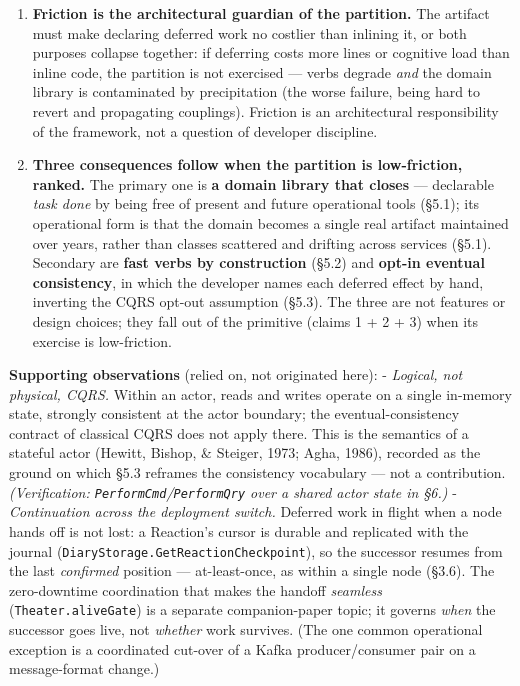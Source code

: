 \documentclass[
]{article}
\let\origtexttt\texttt%
\renewcommand{\texttt}[1]{\origtexttt{\seqsplit{#1}}}%
\let\texttt\origtexttt%
\begin{document}
\begin{enumerate}
\begin{itemize}
    pattern correlates a trajectory, its constituent events can be
    marked elided (\texttt{Metadata.Elide}, §6.5), so the \emph{skips}
    of \href{01-anti-porosity.md}{Paper 1} become the natural outcome of
    a declarative correlation rather than a post-hoc optimization.
  \end{itemize}
\item
  \textbf{Friction is the architectural guardian of the partition.} The
  artifact must make declaring deferred work no costlier than inlining
  it, or both purposes collapse together: if deferring costs more lines
  or cognitive load than inline code, the partition is not exercised ---
  verbs degrade \emph{and} the domain library is contaminated by
  precipitation (the worse failure, being hard to revert and propagating
  couplings). Friction is an architectural responsibility of the
  framework, not a question of developer discipline.
\item
  \textbf{Three consequences follow when the partition is low-friction,
  ranked.} The primary one is \textbf{a domain library that closes} ---
  declarable \emph{task done} by being free of present and future
  operational tools (§5.1); its operational form is that the domain
  becomes a single real artifact maintained over years, rather than
  classes scattered and drifting across services (§5.1). Secondary are
  \textbf{fast verbs by construction} (§5.2) and \textbf{opt-in eventual
  consistency}, in which the developer names each deferred effect by
  hand, inverting the CQRS opt-out assumption (§5.3). The three are not
  features or design choices; they fall out of the primitive (claims 1 +
  2 + 3) when its exercise is low-friction.
\end{enumerate}

\textbf{Supporting observations} (relied on, not originated here): -
\emph{Logical, not physical, CQRS.} Within an actor, reads and writes
operate on a single in-memory state, strongly consistent at the actor
boundary; the eventual-consistency contract of classical CQRS does not
apply there. This is the semantics of a stateful actor (Hewitt, Bishop,
\& Steiger, 1973; Agha, 1986), recorded as the ground on which §5.3
reframes the consistency vocabulary --- not a contribution.
\emph{(Verification: \texttt{PerformCmd}/\texttt{PerformQry} over a
shared actor state in §6.)} - \emph{Continuation across the deployment
switch.} Deferred work in flight when a node hands off is not lost: a
Reaction's cursor is durable and replicated with the journal
(\texttt{DiaryStorage.GetReactionCheckpoint}), so the successor resumes
from the last \emph{confirmed} position --- at-least-once, as within a
single node (§3.6). The zero-downtime coordination that makes the
handoff \emph{seamless} (\texttt{Theater.aliveGate}) is a separate
companion-paper topic; it governs \emph{when} the successor goes live,
not \emph{whether} work survives. (The one common operational exception
is a coordinated cut-over of a Kafka producer/consumer pair on a
message-format change.)
\end{document}
